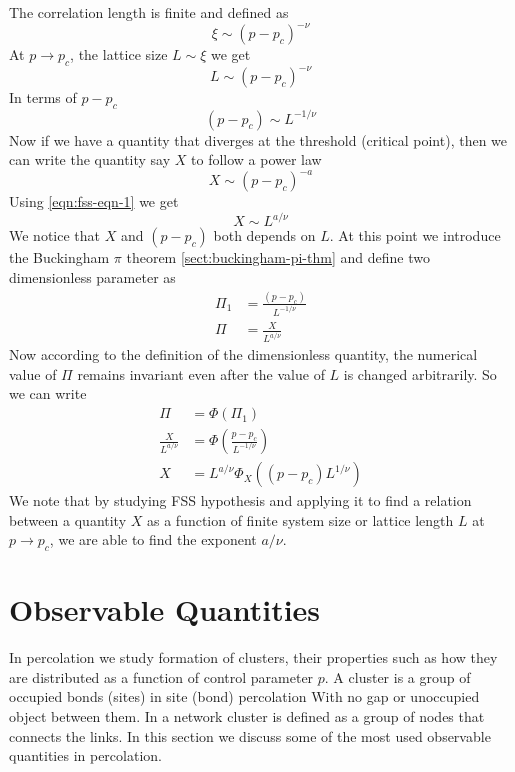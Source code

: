 	The correlation length is finite and defined as 
	\begin{equation}
		\xi \sim (p-p_c)^{-\nu}
	\end{equation}
	At $p \rightarrow p_c$, the lattice size $L\sim \xi$ we get
	\begin{equation}
		L \sim (p - p_c)^{-\nu}
	\end{equation}
	In terms of $p-p_c$
	\begin{equation}
		(p-p_c) \sim L^{-1/\nu}
		\label{eqn:fss-eqn-1}
	\end{equation}
	Now if we have a quantity that diverges at the threshold (critical point), then we can write the quantity say $X$ to follow a power law
	\begin{equation}
		X \sim (p-p_c)^{-a}
	\end{equation}
	Using \ref{eqn:fss-eqn-1} we get
	\begin{equation}
		X \sim L^{a/\nu}
	\end{equation}
	We notice that $X$ and $(p-p_c)$ both depends on $L$. At this point we introduce the Buckingham $\pi$ theorem \ref{sect:buckingham-pi-thm} and define two dimensionless parameter as
	\begin{align}
		\Pi_1 &= \frac{(p-p_c)}{L^{-1/\nu}} \\
		\Pi   &= \frac{X}{L^{a/\nu}}
	\end{align}
	Now according to the definition of the dimensionless quantity, the numerical value of $\Pi$ remains invariant even after the value of $L$ is changed arbitrarily. So we can write
	\begin{align}
		\Pi &= \Phi(\Pi_1) \\
		\frac{X}{L^{a/\nu}} &= \Phi\left(\frac{p-p_c}{L^{-1/\nu}}\right) \label{eqn:fss-in-action-collapse} \\
		X &= L^{a/\nu} \Phi_X \left((p-p_c)L^{1/\nu}\right)
		\label{eqn:fss-in-action}
	\end{align}
	We note that by studying FSS hypothesis and applying it to find a relation between a quantity $X$ as a function of finite system size or lattice length $L$ at $p \rightarrow p_c$, we are able to find the exponent $a/\nu$.

	
\section{Observable Quantities}
	In percolation we study formation of clusters, their properties such as how they are distributed as a function of control parameter $p$. A cluster is a group of occupied bonds (sites) in site (bond) percolation \cite{redefinition-of-site-percolation} With no gap or unoccupied object between them. In a network cluster is defined as a group of nodes that connects the links. In this section we discuss some of the most used observable quantities in percolation.
	
